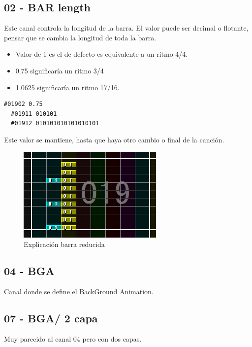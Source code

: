 \documentclass[a4paper,11pt,oneside]{book}
\begin{document}
\subsection{02 - BAR length}
Este canal controla la longitud de la barra.
El valor puede ser decimal o flotante, pensar que se cambia la longitud de toda la barra.


 \begin{itemize}
   \item Valor de 1 es el de defecto es equivalente a un ritmo 4/4.
   \item 0.75 significaría un ritmo 3/4
   \item 1.0625 significaría un ritmo 17/16.
 \end{itemize}

\begin{Verbatim}[frame=single]
  #01902 0.75
  #01911 010101
  #01912 010101010101010101
\end{Verbatim}

Este valor se mantiene, hasta que haya otro cambio o final de la canción.

\begin{figure}[H]
\begin{center}
\includegraphics[scale=1.0]{Imagenes/canal_reducido.png}
\caption{Explicación barra reducida}
\label{Explicación barra reducida}
\end{center}
\end{figure}


\subsection{04 - BGA}
Canal donde se define el BackGround Animation.

\subsection{07 - BGA/ 2 capa}
Muy parecido al canal 04 pero con dos capas.
\end{document}
